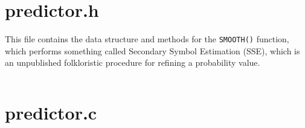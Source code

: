 \documentclass[10pt, fleqn]{article}
\theoremstyle{break}
\newcommand{\0}    {\mathbf{0}}
\numberwithin{equation}{section}
\begin{document}
\pagebreak
\section{predictor.h}
\begin{snugshade}
This file contains the data structure and methods for the {\tt SMOOTH()} 
function, which performs something called Secondary Symbol Estimation (SSE),
which is an unpublished folkloristic procedure for refining a probability
value.
\end{snugshade}
\inputminted[mathescape,
               linenos,
               firstnumber=last,
               numbersep=5pt,
               gobble=0,
               frame=none,
               fontsize=\small,
               framesep=2mm]{c}{../predictor.h}
\section{predictor.c}
\begin{multicols}{2}
\inputminted[mathescape,
               linenos,
               firstnumber=last,
               numbersep=5pt,
               gobble=0,
               frame=none,
               fontsize=\tiny,
               framesep=2mm]{c}{../predictor.c}
\end{multicols}

\pagebreak
\end{document}
